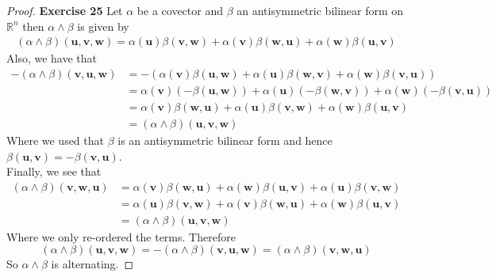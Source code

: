 \documentclass[11pt]{article}
\newcommand{\R}{\mathbb{R}}
\theoremstyle{definition}
\begin{document}
\begin{proof}{\textbf{Exercise 25}}
    Let $\alpha$ be a covector and $\beta$ an antisymmetric bilinear form on
    $\R^n$ then $\alpha \wedge \beta$ is given by
    \begin{align*}
        (\alpha\wedge\beta)(\bm{u}, \bm{v}, \bm{w})
        = \alpha(\bm{u})\beta(\bm{v}, \bm{w}) + \alpha(\bm{v})\beta(\bm{w}, \bm{u})
        + \alpha(\bm{w})\beta(\bm{u}, \bm{v})
    \end{align*}
    Also, we have that
    \begin{align*}
        -(\alpha\wedge\beta)(\bm{v}, \bm{u}, \bm{w})
        &= -(\alpha(\bm{v})\beta(\bm{u}, \bm{w}) + \alpha(\bm{u})\beta(\bm{w}, \bm{v})
        + \alpha(\bm{w})\beta(\bm{v}, \bm{u}))\\
        &= \alpha(\bm{v})(-\beta(\bm{u}, \bm{w})) + \alpha(\bm{u})(-\beta(\bm{w}, \bm{v}))
        + \alpha(\bm{w})(-\beta(\bm{v}, \bm{u}))\\
        &= \alpha(\bm{v})\beta(\bm{w}, \bm{u}) + \alpha(\bm{u})\beta(\bm{v}, \bm{w})
        + \alpha(\bm{w})\beta(\bm{u}, \bm{v})\\
        &= (\alpha\wedge\beta)(\bm{u}, \bm{v}, \bm{w})
    \end{align*}
    Where we used that $\beta$ is an antisymmetric bilinear form and hence
    $\beta(\bm{u},\bm{v}) = -\beta(\bm{v},\bm{u})$.\\
    Finally, we see that
    \begin{align*}
        (\alpha\wedge\beta)(\bm{v}, \bm{w}, \bm{u})
        &= \alpha(\bm{v})\beta(\bm{w}, \bm{u}) + \alpha(\bm{w})\beta(\bm{u}, \bm{v})
        + \alpha(\bm{u})\beta(\bm{v}, \bm{w})\\
        &= \alpha(\bm{u})\beta(\bm{v}, \bm{w}) + \alpha(\bm{v})\beta(\bm{w}, \bm{u})
        + \alpha(\bm{w})\beta(\bm{u}, \bm{v})\\
        &= (\alpha\wedge\beta)(\bm{u}, \bm{v}, \bm{w})
    \end{align*}
    Where we only re-ordered the terms. Therefore
    $$(\alpha\wedge\beta)(\bm{u}, \bm{v}, \bm{w})
    = -(\alpha\wedge\beta)(\bm{v}, \bm{u}, \bm{w})
    = (\alpha\wedge\beta)(\bm{v}, \bm{w}, \bm{u})$$
    So $\alpha\wedge\beta$ is alternating.
\end{proof}
\cleardoublepage
\end{document}
